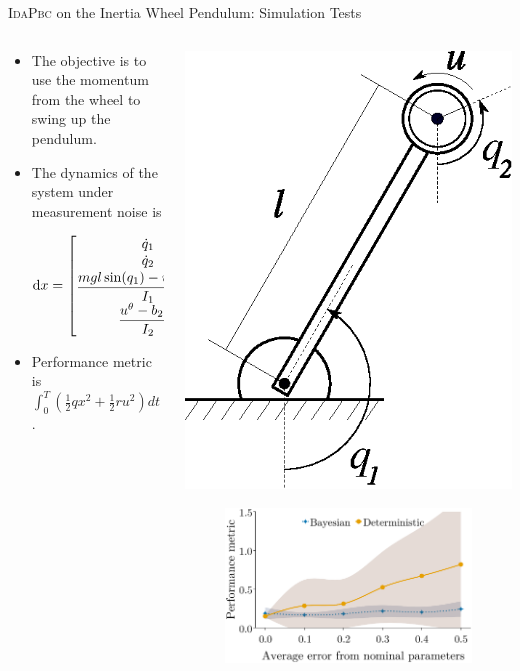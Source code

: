 \begin{frame}{\textsc{IdaPbc} on the Inertia Wheel Pendulum: Simulation Tests}
    \begin{columns}
        \begin{column}{0.48\linewidth}
            \small
            \begin{itemize}
                \item The objective is to use the momentum from the wheel to swing up the pendulum.
                \item The dynamics of the system under measurement noise is 

            \begin{equation*}
                \dd x = \bmat{\dot{q}_1 \\ \dot{q}_2 \\ \dfrac{mgl \sin(q_1) - u^\theta - b_1\dot{q}_1}{I_1} \\ \dfrac{u^\theta - b_2 \dot{q}_2}{I_2}} \dd t + \nabla_x u^\theta(x) \sigma \dd W_t
            \end{equation*}
            \item Performance metric is $\int_0^T \left(\frac{1}{2}qx^2 + \frac{1}{2}ru^2 \right) dt$.
        \end{itemize}
        \end{column}
        \begin{column}{0.52\linewidth}
            \includegraphics[width=0.25\linewidth, center]{figures/iwp.eps}
            \vspace{-0.95cm}
            \begin{figure}
                \centering
                \includegraphics[width=0.9\linewidth, center]{figures/bandplot1.eps}
            \end{figure}
        \end{column}
    \end{columns}
\end{frame}


